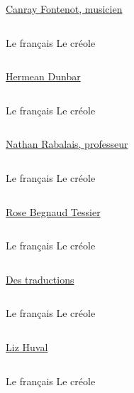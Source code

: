 \documentclass{beamer}
\begin{document}
    \begin{frame}[t]{}
      \centering
      \href{https://youtu.be/2Xs_9rEh1Ec?t=136}{Canray Fontenot, musicien}
      \begin{columns}
          \centering
          Le français
          \centering
          Le créole
      \end{columns}
    \end{frame}

    \begin{frame}[t]{}
      \centering
      \href{https://youtu.be/6hf5PUe2TSA?t=97}{Hermean Dunbar}
      \begin{columns}
          \centering
          Le français
          \centering
          Le créole
      \end{columns}
    \end{frame}

    \begin{frame}[t]{}
      \centering
      \href{https://youtu.be/siflvTt24Zw?t=121}{Nathan Rabalais, professeur}
      \begin{columns}
          \centering
          Le français
          \centering
          Le créole
      \end{columns}
    \end{frame}

    \begin{frame}[t]{}
      \centering
      \href{https://youtu.be/-lgXc_-a9Kc?t=99}{Rose Begnaud Tessier}
      \begin{columns}
          \centering
          Le français
          \centering
          Le créole
      \end{columns}
    \end{frame}

    \begin{frame}[t]{}
      \centering
      \href{https://youtu.be/QodpvU-Z2PI?t=83}{Des traductions}
      \begin{columns}
          \centering
          Le français
          \centering
          Le créole
      \end{columns}
    \end{frame}

    \begin{frame}[t]{}
      \centering
      \href{https://youtu.be/Xj_AtDj-LT4?t=87}{Liz Huval}
      \begin{columns}
          \centering
          Le français
          \centering
          Le créole
      \end{columns}
    \end{frame}
\end{document}
